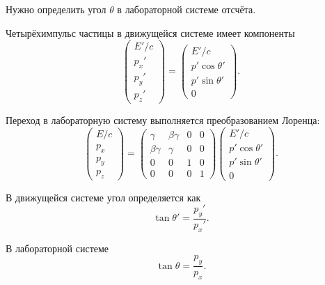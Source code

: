 \documentclass[../final.tex]{subfiles}
\begin{document}
Нужно определить угол $\theta$ в лабораторной системе отсчёта.

Четырёхимпульс частицы в движущейся системе имеет компоненты
%
\begin{equation*}
    \begin{pmatrix}
        E'/c\\
        p_x'\\
        p_y'\\
        p_z'
    \end{pmatrix}
    =
    \begin{pmatrix}
        E'/c\\
        p'\cos\theta'\\
        p'\sin\theta'\\
        0
    \end{pmatrix}.
\end{equation*}

Переход в лабораторную систему выполняется преобразованием Лоренца:
%
\begin{equation*}
    \begin{pmatrix}
        E/c\\
        p_x\\
        p_y\\
        p_z
    \end{pmatrix}
    =
    \begin{pmatrix}
        \gamma      & \beta\gamma & 0 & 0\\
        \beta\gamma & \gamma      & 0 & 0\\
        0           & 0           & 1 & 0\\
        0           & 0           & 0 & 1
    \end{pmatrix}
    \begin{pmatrix}
        E'/c\\
        p'\cos\theta'\\
        p'\sin\theta'\\
        0
    \end{pmatrix}.
\end{equation*}

В движущейся системе угол определяется как
%
\begin{equation*}
    \tan\theta'
    =
    \frac{p_y'}{p_x'}.
\end{equation*}

В лабораторной системе
%
\begin{equation*}
    \tan\theta
    =
    \frac{p_y}{p_x}.
\end{equation*}
\end{document}
